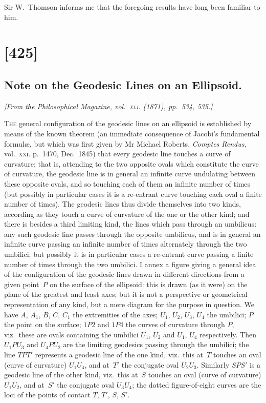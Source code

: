 \documentclass[11pt,a4paper]{article}
\theoremstyle{plain}
\theoremstyle{definition}
\begin{document}
Sir W.\ Thomson informs me that the foregoing results have long been familiar to
him.

\clearpage

\section{[425]}
\subsection{Note on the Geodesic Lines on an Ellipsoid.}

\begin{center}
\textit{[From the Philosophical Magazine, vol.~\textsc{xli}. (1871), pp.~534, 535.]}
\end{center}

\textsc{The} general configuration of the geodesic lines on an ellipsoid is established by
means of the known theorem (an immediate consequence of Jacobi's fundamental formul\ae,
but which was first given by Mr Michael Roberts, \textit{Comptes Rendus}, vol.~\textsc{xxi}. p.~1470,
Dec.\ 1845) that every geodesic line touches a curve of curvature; that is, attending
to the two opposite ovals which constitute the curve of curvature, the geodesic line is in
general an infinite curve undulating between these opposite ovals, and so touching each
of them an infinite number of times (but possibly in particular cases it is a re-entrant
curve touching each oval a finite number of times).  The geodesic lines thus divide
themselves into two kinds, according as they touch a curve of curvature of the one
or the other kind; and there is besides a third limiting kind, the lines which pass
through an umbilicus: any such geodesic line passes through the opposite umbilicus,
and is in general an infinite curve passing an infinite number of times alternately
through the two umbilici; but possibly it is in particular cases a re-entrant curve
passing a finite number of times through the two umbilici.  I annex a figure giving
a general idea of the configuration of the geodesic lines drawn in different directions
from a given point~$P$ on the surface of the ellipsoid: this is drawn (as it were) on
the plane of the greatest and least axes; but it is not a perspective or geometrical
representation of any kind, but a mere diagram for the purpose in question.  We have
$A$, $A_1$, $B$, $C$, $C_1$ the extremities of the axes; $U_1$, $U_2$, $U_3$, $U_4$ the umbilici; $P$ the point
on the surface; $1P2$ and $1P4$ the curves of curvature through $P$, viz.\ these are ovals
containing the umbilici $U_1$, $U_2$ and $U_1$, $U_4$ respectively.  Then $U_1PU_3$ and $U_4PU_2$ are
the limiting geodesics passing through the umbilici; the line $TPT'$ represents a
geodesic line of the one kind, viz.\ this at~$T$ touches an oval (curve of curvature) $U_1U_4$,
and at~$T'$ the conjugate oval $U_2U_3$.  Similarly $SPS'$ is a geodesic line of the other
kind, viz.\ this at~$S$ touches an oval (curve of curvature) $U_1U_2$, and at~$S'$ the conjugate
oval $U_3U_4$; the dotted figure-of-eight curves are the loci of the points of contact
$T$, $T'$, $S$, $S'$.
\end{document}
